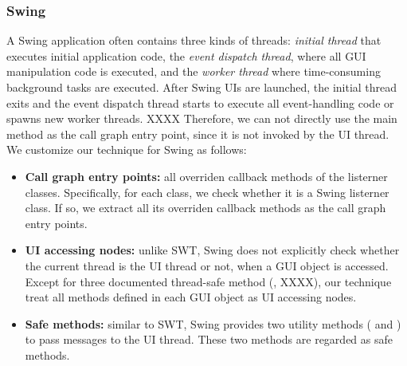 \subsubsection{Swing}



A Swing application often contains three kinds of threads: \textit{initial thread}
that executes initial application code, the \textit{event dispatch thread},
where all GUI manipulation code is executed, and the \textit{worker thread} where
time-consuming background tasks are executed. After Swing UIs are launched,
the initial thread exits and the event dispatch thread starts to execute all
event-handling code or spawns new worker threads. XXXX Therefore, we can not directly
use the main method as the call graph entry point, since it is not invoked
by the UI thread. We customize our technique for Swing as follows:

\begin{itemize}

\item \textbf{Call graph entry points: } all overriden callback methods of the listerner classes.
Specifically, for each class, we check whether it is a Swing listerner class. If so,
we extract all its overriden callback methods as the call graph entry points.

\item \textbf{UI accessing nodes:} unlike SWT, Swing does not explicitly check
whether the current thread is the UI thread or not, when a GUI object is accessed. Except
for three documented thread-safe method (, XXXX), our technique
treat all methods defined in each GUI object as UI accessing nodes.

\item \textbf{Safe methods: } similar to SWT, Swing provides two utility methods
( and ) to pass messages to the UI thread. These two methods are regarded as safe methods.

\end{itemize}

